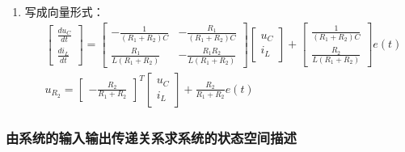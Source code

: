 \begin{example}
\begin{enumerate}
        \item 写成向量形式：
        \begin{equation*}
            \begin{split}
                &\left[
                    \begin{array}{c}
                        \frac{du_C}{dt} \\ \frac{di_L}{dt}
                    \end{array}
                \right] = 
                \left[
                    \begin{array}{cc}
                        -\frac{1}{(R_1 + R_2)C} & -\frac{R_1}{(R_1+R_2)C} \\
                        \frac{R_1}{L(R_1+R_2)} & -\frac{R_1 R_2}{L(R_1+R_2)}
                    \end{array}
                \right]
                \left[
                    \begin{array}{c}
                        u_C \\ i_L
                    \end{array}
                \right] + 
                \left[
                    \begin{array}{c}
                        \frac{1}{(R_1 + R_2)C} \\ \frac{R_2}{L(R_1+R_2)}
                    \end{array}
                \right]e(t) \\
                &u_{R_2} = \left[
                    \begin{array}{c}
                        -\frac{R_2}{R_1+R_2}
                    \end{array}
                \right]^T 
                \left[
                    \begin{array}{c}
                        u_C \\ i_L
                    \end{array}
                \right] + \frac{R_2}{R_1+R_2} e(t)
            \end{split}
        \end{equation*}
    \end{enumerate}
\end{example}

\subsubsection{由系统的输入输出传递关系求系统的状态空间描述}

